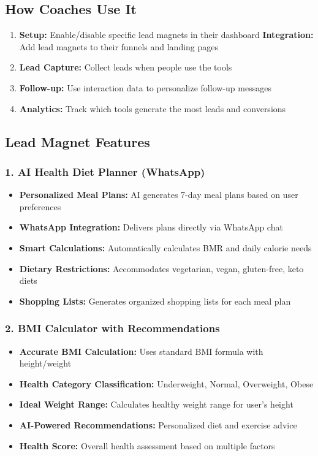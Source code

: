 \documentclass[12pt,a4paper]{article}
\begin{document}
\subsection{How Coaches Use It}
\begin{enumerate}
    \item \textbf{Setup:} Enable/disable specific lead magnets in their dashboard
    \textbf{Integration:} Add lead magnets to their funnels and landing pages
    \item \textbf{Lead Capture:} Collect leads when people use the tools
    \item \textbf{Follow-up:} Use interaction data to personalize follow-up messages
    \item \textbf{Analytics:} Track which tools generate the most leads and conversions
\end{enumerate}

\subsection{Lead Magnet Features}

\subsubsection{1. AI Health Diet Planner (WhatsApp)}
\begin{itemize}
    \item \textbf{Personalized Meal Plans:} AI generates 7-day meal plans based on user preferences
    \item \textbf{WhatsApp Integration:} Delivers plans directly via WhatsApp chat
    \item \textbf{Smart Calculations:} Automatically calculates BMR and daily calorie needs
    \item \textbf{Dietary Restrictions:} Accommodates vegetarian, vegan, gluten-free, keto diets
    \item \textbf{Shopping Lists:} Generates organized shopping lists for each meal plan
\end{itemize}

\subsubsection{2. BMI Calculator with Recommendations}
\begin{itemize}
    \item \textbf{Accurate BMI Calculation:} Uses standard BMI formula with height/weight
    \item \textbf{Health Category Classification:} Underweight, Normal, Overweight, Obese
    \item \textbf{Ideal Weight Range:} Calculates healthy weight range for user's height
    \item \textbf{AI-Powered Recommendations:} Personalized diet and exercise advice
    \item \textbf{Health Score:} Overall health assessment based on multiple factors
\end{itemize}
\end{document}
